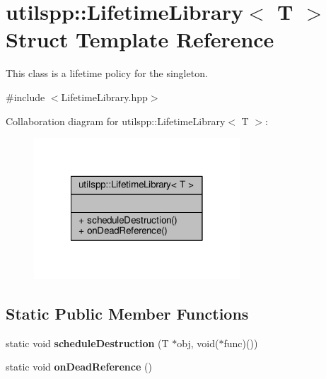 \hypertarget{structutilspp_1_1LifetimeLibrary}{\section{utilspp\-:\-:Lifetime\-Library$<$ T $>$ Struct Template Reference}
\label{structutilspp_1_1LifetimeLibrary}
}


This class is a lifetime policy for the singleton.  




{\ttfamily \#include $<$Lifetime\-Library.\-hpp$>$}



Collaboration diagram for utilspp\-:\-:Lifetime\-Library$<$ T $>$\-:\nopagebreak
\begin{figure}[H]
\begin{center}
\leavevmode
\includegraphics[width=218pt]{structutilspp_1_1LifetimeLibrary__coll__graph}
\end{center}
\end{figure}
\subsection*{Static Public Member Functions}
\begin{DoxyCompactItemize}
\item 
\hypertarget{structutilspp_1_1LifetimeLibrary_a7af7f33cb35f12ebccc192717ade7720}{static void {\bfseries schedule\-Destruction} (T $\ast$obj, void($\ast$func)())}\label{structutilspp_1_1LifetimeLibrary_a7af7f33cb35f12ebccc192717ade7720}

\item 
\hypertarget{structutilspp_1_1LifetimeLibrary_a3504154dda979768ed0c81dc4bf5d54e}{static void {\bfseries on\-Dead\-Reference} ()}\label{structutilspp_1_1LifetimeLibrary_a3504154dda979768ed0c81dc4bf5d54e}

\end{DoxyCompactItemize}


